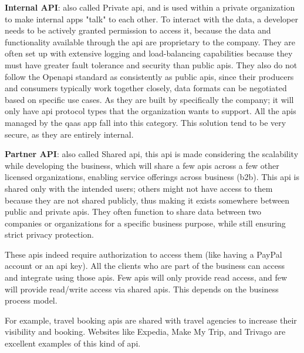 \begin{multicols}{2}
      \textbf{Internal API}: also called Private \acrshort{api}, and is used within a private organization to make internal
      apps "talk" to each other. To interact with the data, a developer needs to be actively granted permission to access it, 
      because the data and functionality available through the \acrshort{api} are proprietary to the company. They are often 
      set up with extensive logging and load-balancing capabilities because they must have greater fault tolerance and 
      security than public \acrshort{api}s. They also do not follow the Open\acrshort{api} standard as consistently
      as public \acrshort{api}s, since their producers and consumers typically work together closely, data formats 
      can be negotiated based on specific use cases. As they are built by specifically the company; it will only have 
      \acrshort{api} protocol types that the organization wants to support. All the \acrshort{api}s managed by the 
      \acrshort{qaas} app fall into this category. This solution tend to be very secure, as they are entirely internal. 
      
      \textbf{Partner API}: also called Shared \acrshort{api}, this \acrshort{api} is made considering the scalability 
      while developing the business, which will share a few \acrshort{api}s across a few other licensed organizations, 
      enabling service offerings across business (\acrshort{b2b}). This \acrshort{api} is shared only with the intended 
      users; others might not have access to them because they are not shared publicly, thus making it exists somewhere 
      between public and private \acrshort{api}s. They often function to share data between two companies or organizations 
      for a specific business purpose, while still ensuring strict privacy protection.  
      
      These \acrshort{api}s indeed require authorization to access them (like having a PayPal account or an \acrshort{api} 
      key). All the clients who are part of the business can access and integrate using those \acrshort{api}s. Few 
      \acrshort{api}s will only provide read access, and few will provide read/write access via shared \acrshort{api}s. 
      This depends on the business process model.

      For example, travel booking \acrshort{api}s are shared with travel agencies to increase their visibility and
      booking. Websites like Expedia, Make My Trip, and Trivago are excellent examples of this kind of \acrshort{api}.


\end{multicols}
